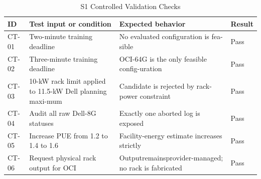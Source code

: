 \documentclass[final,3p,12pt,nopreprintline]{elsarticle}
\begin{document}
\begin{table}[htbp]
\caption{S1 Controlled Validation Checks}
\centering
\footnotesize
\setlength{\tabcolsep}{3pt}
\renewcommand{\arraystretch}{1.12}
\begin{tabularx}{\textwidth}{p{0.9cm}X X p{1.2cm}}
\toprule
\textbf{ID} & \textbf{Test input or condition} & \textbf{Expected behavior} & \textbf{Result}\\
\midrule
CT-01 & Two-minute training deadline & No evaluated configuration is fea-sible & Pass\\
CT-02 & Three-minute training deadline & OCI-64G is the only feasible config-uration & Pass\\
CT-03 & 10-kW rack limit applied to 11.5-kW Dell planning maxi-mum & Candidate is rejected by rack-power constraint & Pass\\
CT-04 & Audit all raw Dell-8G statuses & Exactly one aborted log is exposed & Pass\\
CT-05 & Increase PUE from 1.2 to 1.4 to 1.6 & Facility-energy estimate increases strictly & Pass\\
CT-06 & Request physical rack output for OCI & Outputremainsprovider-managed; no rack is fabricated & Pass\\
\bottomrule
\end{tabularx}
\end{table}
\end{document}
